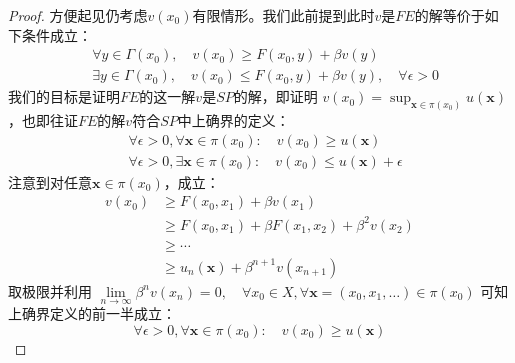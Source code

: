 \begin{proof}
    方便起见仍考虑$v\left(x_0\right)$有限情形。我们此前提到此时$v$是$FE$的解等价于如下条件成立：
    $$
    \begin{aligned}
        &\forall y \in \Gamma\left(x_0\right),\quad v\left(x_0\right)\geq F\left(x_0,y\right) + \beta v\left(y\right)\\
        &\exists y\in \Gamma\left(x_0\right),\quad v\left(x_0\right)\leq F\left(x_0,y\right) + \beta v\left(y\right), 
            \quad \forall \epsilon > 0
    \end{aligned}
    $$
    我们的目标是证明$FE$的这一解$v$是$SP$的解，即证明
    $v\left(x_0\right)=\sup _{\boldsymbol{x}\in\pi\left(x_0\right)} u\left(\boldsymbol{x}\right)$，也即往证$FE$的解$v$符合$SP$中上确界的定义：
    \begin{equation*}
        \begin{aligned}
            &\forall \epsilon > 0, \forall \boldsymbol{x}\in \pi\left(x_0\right): 
                \quad v\left(x_0\right)\geq u\left(\boldsymbol{x}\right) \\
            &\forall \epsilon > 0, \exists \boldsymbol{x}\in\pi\left(x_0\right): 
                \quad v\left(x_0\right)\leq u\left(\boldsymbol{x}\right)+\epsilon
        \end{aligned}
    \end{equation*}
    注意到对任意$\boldsymbol{x}\in \pi\left(x_0\right)$，成立：
    \begin{equation*}
        \begin{aligned}
            v\left(x_0\right) &\geq F\left(x_0,x_1\right) + \beta v\left(x_1\right) \\
                &\geq  F\left(x_0,x_1\right) + \beta F\left(x_1,x_2\right) + \beta^2v\left(x_2\right) \\
                &\geq \cdots \\
                &\geq u_n\left(\boldsymbol{x}\right)+\beta^{n+1}v\left(x_{n+1}\right)
        \end{aligned}
    \end{equation*}
    取极限并利用
    $\lim\limits_{n\rightarrow \infty}\beta^n v\left(x_n\right)=0, 
        \quad \forall x_0\in X, \forall \boldsymbol{x}=\left(x_0,x_1,\dots\right)\in \pi\left(x_0\right)$
    可知上确界定义的前一半成立：
    \begin{equation*}
        \forall \epsilon > 0, \forall \boldsymbol{x}\in \pi\left(x_0\right): 
            \quad v\left(x_0\right)\geq u\left(\boldsymbol{x}\right)
    \end{equation*}

\end{proof}
